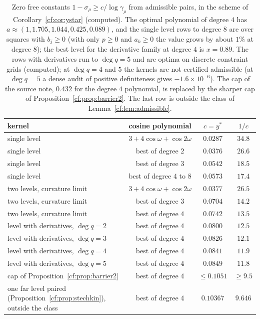\begin{table}[h]
\centering
\small\setlength{\tabcolsep}{4pt}\begin{tabular}{p{1.55in}ccc}
\toprule
kernel & cosine polynomial & $c=y^\ast$ & $1/c$\\
\midrule
single level & $3+4\cos\omega+\cos2\omega$ & $0.0287$ & $34.8$\\
single level & best of degree $2$ & $0.0376$ & $26.6$\\
single level & best of degree $3$ & $0.0542$ & $18.5$\\
single level & best of degree $4$ to $8$ & $0.0573$ & $17.4$\\
two levels, curvature limit & $3+4\cos\omega+\cos2\omega$ & $0.0377$ & $26.5$\\
two levels, curvature limit & best of degree $3$ & $0.0704$ & $14.2$\\
two levels, curvature limit & best of degree $4$ & $0.0742$ & $13.5$\\
level with derivatives, $\deg q=2$ & best of degree $4$ & $0.0800$ & $12.5$\\
level with derivatives, $\deg q=3$ & best of degree $4$ & $0.0826$ & $12.1$\\
level with derivatives, $\deg q=4$ & best of degree $4$ & $0.0841$ & $11.9$\\
level with derivatives, $\deg q=5$ & best of degree $4$ & $0.0849$ & $11.8$\\
\midrule
cap of Proposition~\ref{cf:prop:barrier2} & best of degree $4$ & $\le0.1051$ & $\ge9.5$\\
\midrule
one far level paired (Proposition~\ref{cf:prop:stechkin}), outside the class & best of degree $4$ & $0.10367$ & $9.646$\\
\bottomrule
\end{tabular}
\caption{Zero free constants $1-\sigma_\rho\ge c/\log\gamma_\rho$ from admissible pairs, in the scheme of Corollary~\ref{cf:cor:ystar} (computed). The optimal polynomial of degree $4$ has $a\approx(1,1.705,1.044,0.425,0.089)$, and the single level rows to degree $8$ are over squares with $b_j\ge0$ (with only $p\ge0$ and $a_k\ge0$ the value grows by about $1\%$ at degree $8$); the best level for the derivative family at degree $4$ is $x=0.89$. The rows with derivatives run to $\deg q=5$ and are optima on discrete constraint grids (computed); at $\deg q=4$ and $5$ the kernels are not certified admissible (at $\deg q=5$ a dense audit of positive definiteness gives $-1.6\times10^{-6}$). The cap of the source note, $0.432$ for the degree $4$ polynomial, is replaced by the sharper cap of Proposition~\ref{cf:prop:barrier2}. The last row is outside the class of Lemma~\ref{cf:lem:admissible}.}
\label{cf:tab:arith}
\end{table}

